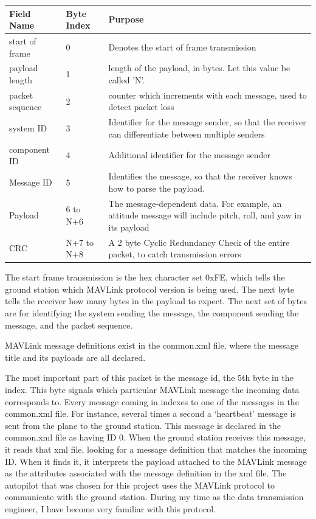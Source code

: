 \documentclass[12pt,journal,compsoc]{IEEEtran}
\begin{document}
\begin{table}[h!]
\centering

\begin{tabular}{|p{1.5cm}|p{0.9cm}|p{5cm}|}
\hline
Field Name & Byte Index & Purpose\\
\hline
start of frame & 0 & Denotes the start of frame transmission \\
\hline
payload length & 1 & length of the payload, in bytes. Let this value be called 'N'. \\
\hline
packet sequence & 2 & counter which increments with each message, used to detect packet loss \\
\hline
system ID & 3 & Identifier for the message sender, so that the receiver can differentiate between multiple senders\\
\hline
component ID & 4 & Additional identifier for the message sender\\
\hline
Message ID & 5 & Identifies the message, so that the receiver knows how to parse the payload.\\
\hline
Payload & 6 to N+6 & The message-dependent data. For example, an attitude message will include pitch, roll, and yaw in its payload\\
\hline
CRC & N+7 to N+8 & A 2 byte Cyclic Redundancy Check of the entire packet, to catch transmission errors\\
\hline
\end{tabular}
\end{table}

The start frame transmission is the hex character set 0xFE, which tells the ground station which MAVLink protocol version is being used. The next byte tells the receiver how many bytes in the payload to expect. The next set of bytes are for identifying the system sending the message, the component sending the message, and the packet sequence.

MAVLink message definitions exist in the common.xml file, where the message title and its payloads are all declared.

The most important part of this packet is the message id, the 5th byte in the index. This byte signals which particular MAVLink message the incoming data corresponds to. Every message coming in indexes to one of the messages in the common.xml file. For instance, several times a second a `heartbeat' message is sent from the plane to the ground station. This message is declared in the common.xml file as having ID 0. When the ground station receives this message, it reads that xml file, looking for a message definition that matches the incoming ID. When it finds it, it interprets the payload attached to the MAVLink message as the attributes associated with the message definition in the xml file. 
The autopilot that was chosen for this project uses the MAVLink protocol to communicate with the ground station. During my time as the data transmission engineer, I have become very familiar with this protocol.
\end{document}
